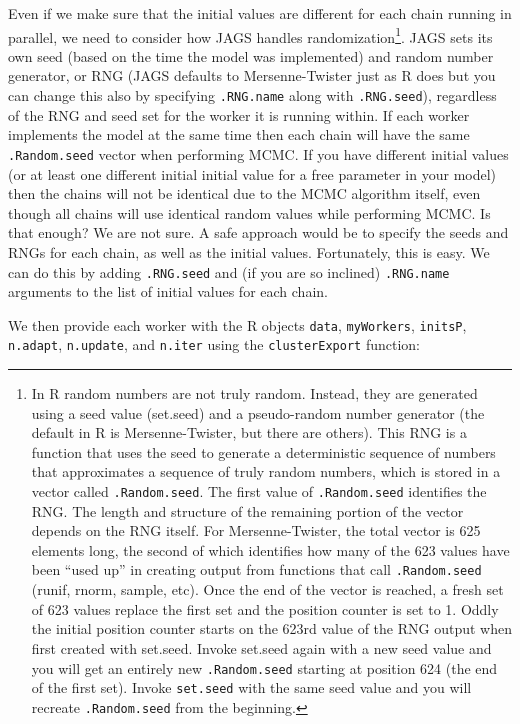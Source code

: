\documentclass[12pt,english]{article}
\newcommand{\q}[1]{``#1''} %
\begin{document}
Even if we make sure that the initial values are different for each chain running in parallel, we need to consider how JAGS handles randomization\footnote{In R random numbers are not truly random. Instead, they are generated using a seed value (set.seed) and a pseudo-random number generator (the default in R is Mersenne-Twister, but there are others). This RNG is a function that uses the seed to generate a deterministic sequence of numbers that approximates a sequence of truly random numbers, which is stored in a vector called \texttt{.Random.seed}. The first value of \texttt{.Random.seed} identifies the RNG. The length and structure of the remaining portion of the vector depends on the RNG itself. For Mersenne-Twister, the total vector is 625 elements long, the second of which identifies how many of the 623 values have been \q{used up} in creating output from functions that call \texttt{.Random.seed} (runif, rnorm, sample, etc). Once the end of the vector is reached, a fresh set of 623 values replace the first set and the position counter is set to 1. Oddly the initial position counter starts on the 623rd value of the RNG output when first created with set.seed. Invoke set.seed again with a new seed value and you will get an entirely new \texttt{.Random.seed} starting at position 624 (the end of the first set). Invoke \texttt{set.seed} with the same seed value and you will recreate \texttt{.Random.seed} from the beginning.}. JAGS sets its own seed (based on the time the model was implemented) and random number generator, or RNG (JAGS defaults to Mersenne-Twister just as R does but you can change this also by specifying \texttt{.RNG.name} along with \texttt{.RNG.seed}), regardless of the RNG and seed set for the worker it is running within. If each worker implements the model at the same time then each chain will have the same \texttt{.Random.seed} vector when performing MCMC. If you have different initial values (or at least one different initial initial value for a free parameter in your model) then the chains will not be identical due to the MCMC algorithm itself, even though all chains will use identical random values while performing MCMC. Is that enough? We are not sure. A safe approach would be to specify the seeds and RNGs for each chain, as well as the initial values. Fortunately, this is easy. We can do this by adding \texttt{.RNG.seed} and (if you are so inclined) \texttt{.RNG.name} arguments to the list of initial values for each chain.

We then provide each worker with the R objects \texttt{data}, \texttt{myWorkers}, \texttt{initsP}, \texttt{n.adapt}, \texttt{n.update}, and \texttt{n.iter} using the \texttt{clusterExport} function:
\end{document}
